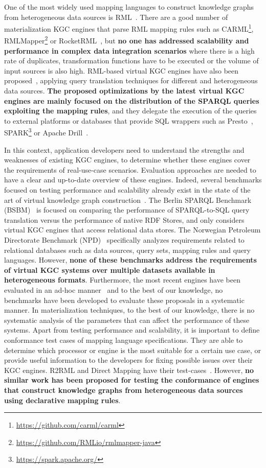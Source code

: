 One of the most widely used mapping languages to construct knowledge graphs from heterogeneous data sources is RML~\citep{dimou2014rml}. There are a good number of materialization KGC engines that parse RML mapping rules such as CARML\footnote{\url{https://github.com/carml/carml}}, RMLMapper\footnote{\url{https://github.com/RMLio/rmlmapper-java}} or RocketRML~\citep{csimcsek2019rocketrml}, but \textbf{no one has addressed scalability and performance in complex data integration scenarios} where there is a high rate of duplicates, transformation functions have to be executed or the volume of input sources is also high. RML-based virtual KGC engines have also been  proposed~\citep{endris2019ontario,mami2019squerall}, applying query translation techniques for different and heterogeneous data sources. \textbf{The proposed optimizations by the latest virtual KGC engines are mainly focused on the distribution of the SPARQL queries exploiting the mapping rules}, and they delegate the execution of the queries to external platforms or databases that provide SQL wrappers such as Presto~\citep{bershad1988presto}, SPARK\footnote{\url{https://spark.apache.org/}} or Apache Drill~\citep{hausenblas2013apache}.

In this context, application developers need to understand the strengths and weaknesses of existing KGC engines, to determine whether these engines cover the requirements of real-use-case scenarios. Evaluation approaches are needed to have a clear and up-to-date overview of these engines. Indeed, several benchmarks focused on testing performance and scalability already exist in the state of the art of virtual knowledge graph construction~\citep{bizer2009berlin,lanti2015npd}. The Berlin SPARQL Benchmark (BSBM)~\citep{bizer2009berlin} is focused on comparing the performance of SPARQL-to-SQL query translation versus the performance of native RDF Stores, and only considers virtual KGC engines that access relational data stores. The Norwegian Petroleum Directorate Benchmark (NPD)~\citep{lanti2015npd} specifically analyzes requirements related to relational databases such as data sources, query sets, mapping rules and query languages. However, \textbf{none of these benchmarks address the requirements of virtual KGC systems over multiple datasets available in heterogeneous formats}. Furthermore, the most recent engines have been evaluated in an ad-hoc manner~\citep{endris2019ontario,mami2019querying} and to the best of our knowledge, no benchmarks have been developed to evaluate these proposals in a systematic manner. In materialization techniques, to the best of our knowledge, there is no systematic analysis of the parameters that can affect the performance of these systems. Apart from testing performance and scalability, it is important to define conformance test cases of mapping language specifications. They are able to determine which processor or engine is the most suitable for a certain use case, or provide useful information to the developers for fixing possible issues over their KGC engines. R2RML and Direct Mapping have their test-cases~\citep{R2RML_test_cases}. However, \textbf{no similar work has been proposed for testing the conformance of engines that construct knowledge graphs from heterogeneous data sources using declarative mapping rules}.


